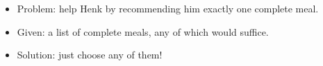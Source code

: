 \begin{frame}
    \frametitle{\problemtitle}
    \begin{itemize}
        \item Problem: help Henk by recommending him exactly one complete meal.
        \item Given: a list of complete meals, any of which would suffice.
        \item Solution: just choose any of them!
    \end{itemize}
\end{frame}
